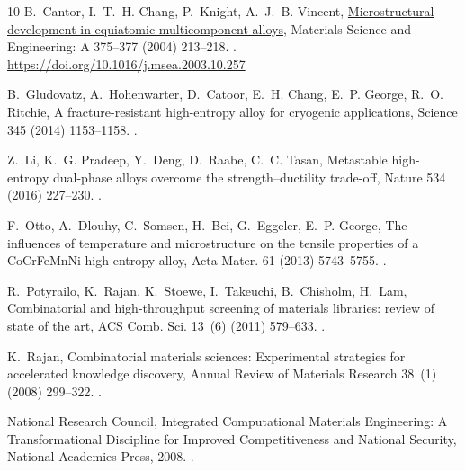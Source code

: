 \documentclass[preprint,12pt,times]{elsarticle}  %
\providecommand{\JournalTitle}[1]{#1}
\begin{document}
\begin{thebibliography}{10}
B.~Cantor, I.~T.~H. Chang, P.~Knight, A.~J.~B. Vincent,
  \href{https://doi.org/10.1016/j.msea.2003.10.257}{Microstructural development
  in equiatomic multicomponent alloys}, {\JournalTitle{Materials Science and
  Engineering: A}} 375--377 (2004) 213--218.
\newblock \href {http://dx.doi.org/10.1016/j.msea.2003.10.257}
  {}.
\newline\urlprefix\url{https://doi.org/10.1016/j.msea.2003.10.257}

B.~Gludovatz, A.~Hohenwarter, D.~Catoor, E.~H. Chang, E.~P. George, R.~O.
  Ritchie, A fracture-resistant high-entropy alloy for cryogenic applications,
  {\JournalTitle{Science}} 345 (2014) 1153--1158.
\newblock \href {http://dx.doi.org/10.1126/science.1254581}
  {}.

Z.~Li, K.~G. Pradeep, Y.~Deng, D.~Raabe, C.~C. Tasan, Metastable high-entropy
  dual-phase alloys overcome the strength--ductility trade-off,
  {\JournalTitle{Nature}} 534 (2016) 227--230.
\newblock \href {http://dx.doi.org/10.1038/nature17981}
  {}.

F.~Otto, A.~Dlouhy, C.~Somsen, H.~Bei, G.~Eggeler, E.~P. George, The influences
  of temperature and microstructure on the tensile properties of a {CoCrFeMnNi}
  high-entropy alloy, {\JournalTitle{Acta Mater.}} 61 (2013) 5743--5755.
\newblock \href {http://dx.doi.org/10.1016/j.actamat.2013.06.018}
  {}.

R.~Potyrailo, K.~Rajan, K.~Stoewe, I.~Takeuchi, B.~Chisholm, H.~Lam,
  Combinatorial and high-throughput screening of materials libraries: review of
  state of the art, {\JournalTitle{ACS Comb. Sci.}} 13~(6) (2011)
  579--633.
\newblock \href {http://dx.doi.org/10.1021/co200007w}
  {}.

K.~Rajan, Combinatorial materials sciences: Experimental strategies for
  accelerated knowledge discovery, {\JournalTitle{Annual Review of Materials
  Research}} 38~(1) (2008) 299--322.
\newblock \href {http://dx.doi.org/10.1146/annurev.matsci.38.060407.130217}
  {}.

{National Research Council}, Integrated Computational Materials Engineering: A
  Transformational Discipline for Improved Competitiveness and National
  Security, National Academies Press, 2008.
\newblock \href {http://dx.doi.org/10.17226/12199} {}.


\end{thebibliography}
\end{document}
